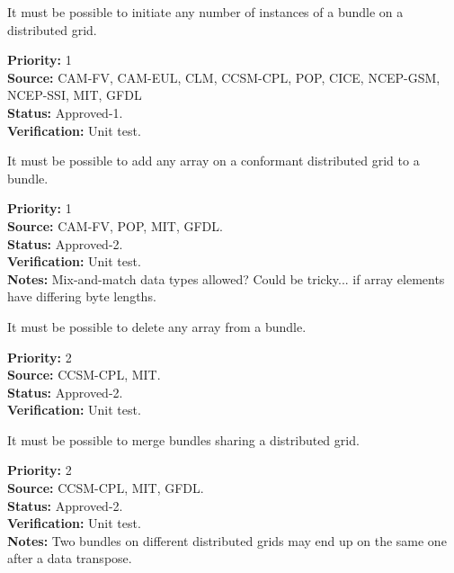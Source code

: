 
It must be possible to initiate any number of instances of a bundle on
a distributed grid.

\begin{reqlist}
{\bf Priority:} 1 \\ 
{\bf Source:} CAM-FV, CAM-EUL, CLM, CCSM-CPL, POP, CICE, NCEP-GSM, NCEP-SSI, MIT, GFDL \\
{\bf Status:} Approved-1. \\
{\bf Verification:} Unit test. 
\end{reqlist}


It must be possible to add any array on a conformant distributed grid
to a bundle.

\begin{reqlist}
{\bf Priority:} 1 \\ 
{\bf Source:} CAM-FV, POP, MIT, GFDL. \\
{\bf Status:} Approved-2. \\
{\bf Verification:} Unit test. \\
{\bf Notes:} Mix-and-match data types allowed? Could be tricky... if
  array elements have differing byte lengths.
\end{reqlist}


It must be possible to delete any array from a bundle.

\begin{reqlist}
{\bf Priority:} 2 \\
{\bf Source:} CCSM-CPL, MIT. \\
{\bf Status:} Approved-2. \\
{\bf Verification:} Unit test. 
\end{reqlist}


It must be possible to merge bundles sharing a distributed grid.

\begin{reqlist}
{\bf Priority:} 2 \\
{\bf Source:} CCSM-CPL, MIT, GFDL. \\
{\bf Status:} Approved-2. \\
{\bf Verification:} Unit test. \\
{\bf Notes:} Two bundles on different distributed grids may end up on the same
  one after a data transpose.  
\end{reqlist}

